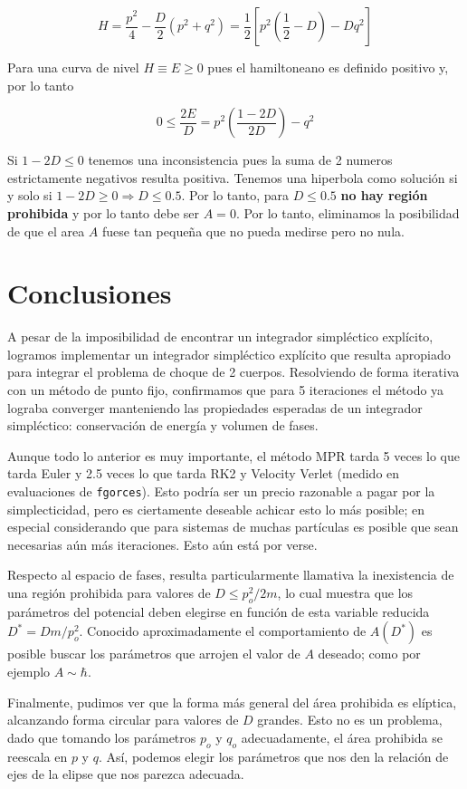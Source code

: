 \documentclass[twoside, 12pt]{article}
\begin{document}
\[ H = \frac{p^2}{4} -\frac{D}{2}(p^2+q^2) = \frac{1}{2}\left[ p^2\left(\frac{1}{2}-D\right) - Dq^2 \right] \]

Para una curva de nivel $H\equiv E \geq 0$ pues el hamiltoneano es definido positivo y, por lo tanto

\[ 0\leq \frac{2E}{D} =  p^2\left(\frac{1-2D}{2D}\right) - q^2  \]

Si $1-2D\leq 0 $ tenemos una inconsistencia pues la suma de 2 numeros estrictamente negativos resulta positiva.
Tenemos una hiperbola como solución si y solo si $1-2D\geq 0 \Longrightarrow D \leq 0.5$. Por lo tanto, para $D \leq 0.5$ \textbf{no hay región prohibida} y por lo tanto debe ser $A=0$.
Por lo tanto, eliminamos la posibilidad de que el area $A$ fuese tan pequeña que no pueda medirse pero no nula.

\section{Conclusiones}

A pesar de la imposibilidad de encontrar un integrador simpléctico explícito, logramos implementar un integrador simpléctico explícito que resulta apropiado para integrar el problema de choque de 2 cuerpos.
Resolviendo de forma iterativa con un método de punto fijo, confirmamos que para 5 iteraciones el método ya lograba converger manteniendo las propiedades esperadas de un integrador simpléctico: conservación 
de energía y volumen de fases. 

Aunque todo lo anterior es muy importante, el método MPR tarda 5 veces lo que tarda Euler y 2.5 veces lo que tarda RK2 y Velocity Verlet (medido en evaluaciones de \texttt{fgorces}).
Esto podría ser un precio razonable a pagar por la simplecticidad, pero es ciertamente deseable achicar esto lo más posible; en especial considerando que para sistemas de muchas partículas es 
posible que sean necesarias aún más iteraciones. Esto aún está por verse.

Respecto al espacio de fases, resulta particularmente llamativa la inexistencia de una región prohibida para valores de $D \leq p_o^2/2m$, lo cual muestra que los parámetros del potencial deben elegirse
en función de esta variable reducida $D^* = Dm/p_o^2$. Conocido aproximadamente el comportamiento de $A(D^*)$ es posible buscar los parámetros que arrojen el valor de $A$ deseado; como por ejemplo $A\sim\hbar$.

Finalmente, pudimos ver que la forma más general del área prohibida es elíptica, alcanzando forma circular para valores de $D$ grandes. 
Esto no es un problema, dado que tomando los parámetros $p_o$ y $q_o$ adecuadamente, el área prohibida se reescala en $p$ y $q$. 
Así, podemos elegir los parámetros que nos den la relación de ejes de la elipse que nos parezca adecuada. 
\end{document}

